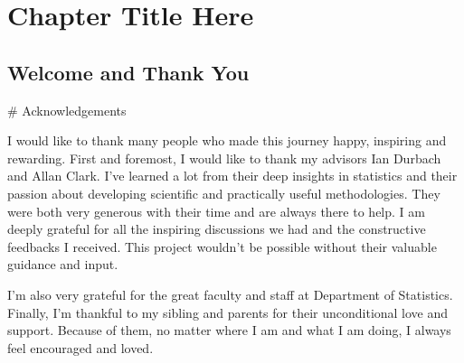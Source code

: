
\chapter{Chapter Title Here} %

\label{Chapter1} %


\newcommand{\keyword}[1]{\textbf{#1}}
\newcommand{\tabhead}[1]{\textbf{#1}}
\newcommand{\code}[1]{\texttt{#1}}
\newcommand{\file}[1]{\texttt{\bfseries#1}}
\newcommand{\option}[1]{\texttt{\itshape#1}}


\section{Welcome and Thank You}

# Acknowledgements 

I would like to thank many people who made this journey happy, inspiring and rewarding. First and foremost, I would like to thank my advisors Ian Durbach and Allan Clark. I’ve learned a lot from their deep insights in statistics and their passion about developing scientific and practically useful methodologies.  They were both very generous with their time and are always there to help. I am deeply grateful for all the inspiring discussions we had and the constructive feedbacks I received. This project wouldn’t be possible without their valuable guidance and input. 

I’m also very grateful for the great faculty and staff at Department of Statistics. Finally, I’m thankful to my sibling and parents for their unconditional love and support. Because of them, no matter where I am and what I am doing, I always feel encouraged and loved.